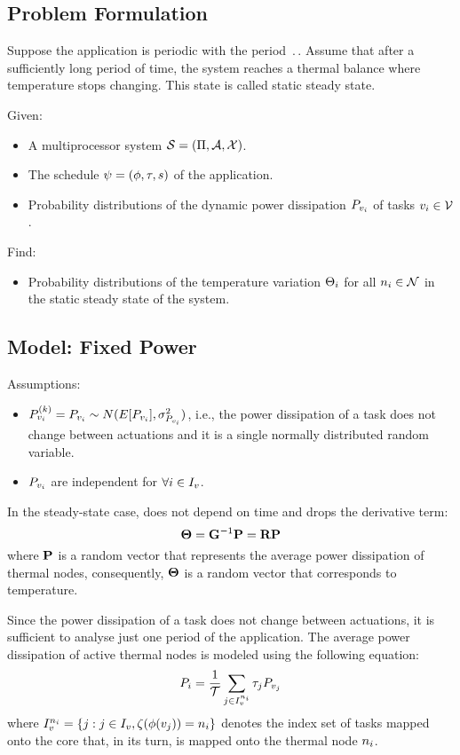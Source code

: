 \subsection{Problem Formulation}
Suppose the application is periodic with the period $\period$. Assume that after a sufficiently long period of time, the system reaches a thermal balance where temperature stops changing. This state is called static steady state.

Given:
\begin{itemize}
  \item A multiprocessor system $\mathcal{S} = (\Pi, \mathcal{A}, \mathcal{X})$.
  \item The schedule $\psi = (\phi, \tau, s)$ of the application.
  \item Probability distributions of the dynamic power dissipation $P_{v_i}$ of tasks $v_i \in \mathcal{V}$.
\end{itemize}

Find:
\begin{itemize}
  \item Probability distributions of the temperature variation $\Theta_i$ for all $n_i \in \mathcal{N}$ in the static steady state of the system.
\end{itemize}

\subsection{Model: Fixed Power} 
Assumptions:
\begin{itemize}
  \item $P^{(k)}_{v_i} = P_{v_i} \sim N(E[P_{v_i}], \sigma_{P_{v_i}}^2)$, i.e., the power dissipation of a task does not change between actuations and it is a single normally distributed random variable.
  \item $P_{v_i}$ are independent for $\forall i \in I_v$.
\end{itemize}

In the steady-state case,  does not depend on time and drops the derivative term:
\[
  \mathbf{\Theta} = \mathbf{G}^{-1} \mathbf{P} = \mathbf{R} \mathbf{P}
\]
where $\mathbf{P}$ is a random vector that represents the average power dissipation of thermal nodes, consequently, $\mathbf{\Theta}$ is a random vector that corresponds to temperature.

Since the power dissipation of a task does not change between actuations, it is sufficient to analyse just one period of the application. The average power dissipation of active thermal nodes is modeled using the following equation:
\begin{equation} \equlabel{node-power}
  \power_i = \frac{1}{\period} \sum_{j \in \taskindex^{\node_i}} \executiontime_j \power_{\task_j}
\end{equation}
where $I_v^{n_i} = \{ j: j \in I_v, \zeta(\phi(v_j)) = n_i \}$ denotes the index set of tasks mapped onto the core that, in its turn, is mapped onto the thermal node $n_i$.

